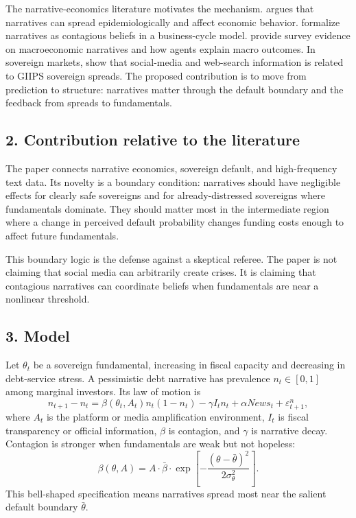 \documentclass[11pt]{article}
\begin{document}
The narrative-economics literature motivates the mechanism. \citet{Shiller2017} argues that narratives can spread epidemiologically and affect economic behavior. \citet{FlynnSastry2024} formalize narratives as contagious beliefs in a business-cycle model. \citet{AndreEtAl2026} provide survey evidence on macroeconomic narratives and how agents explain macro outcomes. In sovereign markets, \citet{DergiadesEtAl2015} show that social-media and web-search information is related to GIIPS sovereign spreads. The proposed contribution is to move from prediction to structure: narratives matter through the default boundary and the feedback from spreads to fundamentals.

\subsection*{2. Contribution relative to the literature}
The paper connects narrative economics, sovereign default, and high-frequency text data. Its novelty is a boundary condition: narratives should have negligible effects for clearly safe sovereigns and for already-distressed sovereigns where fundamentals dominate. They should matter most in the intermediate region where a change in perceived default probability changes funding costs enough to affect future fundamentals.

This boundary logic is the defense against a skeptical referee. The paper is not claiming that social media can arbitrarily create crises. It is claiming that contagious narratives can coordinate beliefs when fundamentals are near a nonlinear threshold.

\subsection*{3. Model}
Let $\theta_t$ be a sovereign fundamental, increasing in fiscal capacity and decreasing in debt-service stress. A pessimistic debt narrative has prevalence $n_t\in[0,1]$ among marginal investors. Its law of motion is
\begin{equation}
n_{t+1}-n_t=\beta(\theta_t,A_t)n_t(1-n_t)-\gamma I_t n_t+\alpha News_t+\varepsilon^n_{t+1}, \label{eq:narrative-law}
\end{equation}
where $A_t$ is the platform or media amplification environment, $I_t$ is fiscal transparency or official information, $\beta$ is contagion, and $\gamma$ is narrative decay. Contagion is stronger when fundamentals are weak but not hopeless:
\begin{equation}
\beta(\theta,A)=A\cdot \bar\beta\cdot \exp\left[-\frac{(\theta-\bar\theta)^2}{2\sigma_\theta^2}\right]. \label{eq:beta-boundary}
\end{equation}
This bell-shaped specification means narratives spread most near the salient default boundary $\bar\theta$.
\end{document}
